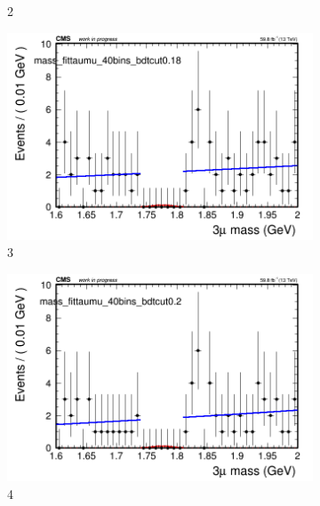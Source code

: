 \begin{figure}[h!]
\begin{subfigure}{0.2\textwidth}
        \caption{2}
    \end{subfigure}
    \begin{subfigure}{0.2\textwidth}
        \includegraphics[width=\textwidth]{power_law/plots/taumu/massfit_taumu_40bins_bdtcut0.18.png}
        \caption{3}
    \end{subfigure}
    \begin{subfigure}{0.2\textwidth}
        \includegraphics[width=\textwidth]{power_law/plots/taumu/massfit_taumu_40bins_bdtcut0.2.png}
        \caption{4}
    \end{subfigure}
    \begin{subfigure}{0.2\textwidth}

\end{subfigure}
\end{figure}

